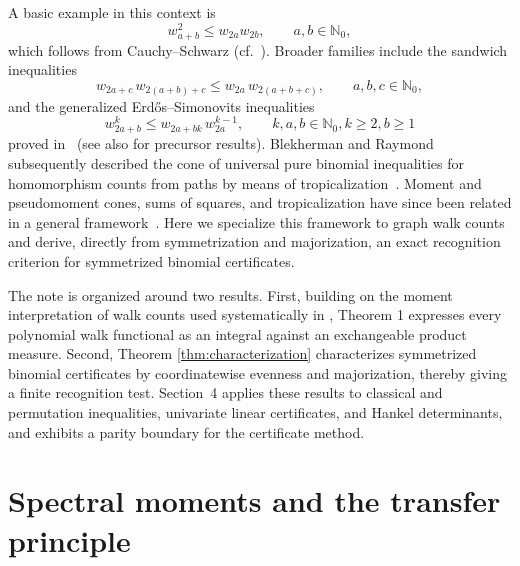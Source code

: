 \documentclass[11pt]{article}
\newcommand{\Nat}{\mathbb{N}}
\theoremstyle{remark}
\begin{document}
A basic example in this context is
\begin{equation}\label{eq:CS-intro}
  w_{a+b}^2\leq w_{2a}w_{2b},
  \qquad a,b\in\Nat_0,
\end{equation}
which follows from Cauchy--Schwarz (cf.~\cite{dress-gutman-2003}).  Broader families include the sandwich inequalities \cite{taeubig-et-al-2013}
\begin{equation}\label{eq:sandwich-intro}
  w_{2a+c}\,w_{2(a+b)+c}
  \leq w_{2a}\,w_{2(a+b+c)},
  \qquad a,b,c\in\Nat_0,
\end{equation}
and the generalized Erd\H{o}s--Simonovits inequalities
\begin{equation}\label{eq:general-ES-intro}
  w_{2a+b}^{k}
  \leq w_{2a+bk}\,w_{2a}^{k-1},
  \qquad k,a,b\in\Nat_0, k\ge 2, b\ge 1
\end{equation}
proved in~\cite{taeubig-et-al-2013} (see also
\cite{blakley-roy-1965,erdos-simonovits-1982,lagarias-et-al-1984} for precursor results).  Blekherman and Raymond subsequently described the cone of universal pure binomial inequalities for homomorphism counts from paths by means of tropicalization~\cite{blekherman-raymond-2022}.  
Moment and pseudomoment cones, sums of squares, and tropicalization have since been related in a general framework~\cite{blekherman-et-al-2025}.  
Here we specialize this framework to graph walk counts and derive, directly from symmetrization and majorization, an exact recognition criterion for symmetrized binomial certificates.


The note is organized around two results. 
First, building on the moment interpretation of walk
counts used systematically in \cite{barreras-et-al-2021}, Theorem 1 expresses every polynomial walk functional as an integral against an exchangeable
product measure. Second, Theorem \ref{thm:characterization} characterizes symmetrized binomial certificates by coordinatewise evenness and majorization, thereby giving a finite recognition test. Section~4 applies these results to classical and permutation inequalities, univariate linear certificates, and Hankel determinants, and exhibits a parity boundary for the certificate method.



\section{Spectral moments and the transfer principle}
\end{document}
